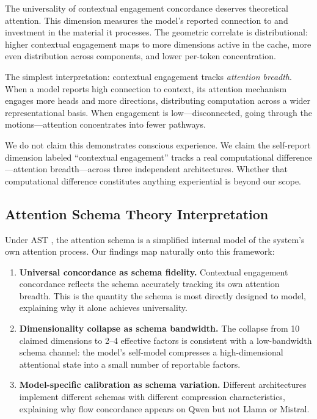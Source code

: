 \documentclass[11pt,a4paper]{article}
\begin{document}
The universality of contextual engagement concordance deserves theoretical attention. This dimension measures the model's reported connection to and investment in the material it processes. The geometric correlate is distributional: higher contextual engagement maps to more dimensions active in the cache, more even distribution across components, and lower per-token concentration.

The simplest interpretation: contextual engagement tracks \emph{attention breadth}. When a model reports high connection to context, its attention mechanism engages more heads and more directions, distributing computation across a wider representational basis. When engagement is low---disconnected, going through the motions---attention concentrates into fewer pathways.

We do not claim this demonstrates conscious experience. We claim the self-report dimension labeled ``contextual engagement'' tracks a real computational difference---attention breadth---across three independent architectures. Whether that computational difference constitutes anything experiential is beyond our scope.

\subsection{Attention Schema Theory Interpretation}

Under AST \citep{webb2015attention,graziano2017attention}, the attention schema is a simplified internal model of the system's own attention process. Our findings map naturally onto this framework:

\begin{enumerate}[nosep]
    \item \textbf{Universal concordance as schema fidelity.} Contextual engagement concordance reflects the schema accurately tracking its own attention breadth. This is the quantity the schema is most directly designed to model, explaining why it alone achieves universality.

    \item \textbf{Dimensionality collapse as schema bandwidth.} The collapse from 10 claimed dimensions to 2--4 effective factors is consistent with a low-bandwidth schema channel: the model's self-model compresses a high-dimensional attentional state into a small number of reportable factors.

    \item \textbf{Model-specific calibration as schema variation.} Different architectures implement different schemas with different compression characteristics, explaining why flow concordance appears on Qwen but not Llama or Mistral.
\end{enumerate}
\end{document}
